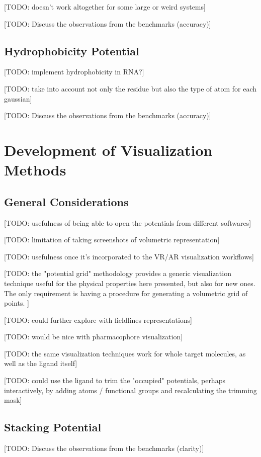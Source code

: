     [TODO: doesn't work altogether for some large or weird systems]

    [TODO: Discuss the observations from the benchmarks (accuracy)]

  \subsection{Hydrophobicity Potential}
    [TODO: implement hydrophobicity in RNA?]

    [TODO: take into account not only the residue but also the type of atom for each gaussian]

    [TODO: Discuss the observations from the benchmarks (accuracy)]


\section{Development of Visualization Methods}
  \subsection{General Considerations}
    [TODO: usefulness of being able to open the potentials from different softwares]

    [TODO: limitation of taking screenshots of volumetric representation]

    [TODO: usefulness once it's incorporated to the VR/AR visualization workflows]

    [TODO: the "potential grid" methodology provides a generic visualization technique useful for the physical properties here presented, but also for new ones. The only requirement is having a procedure for generating a volumetric grid of points. ] %

    [TODO: could further explore with fieldlines representations]

    [TODO: would be nice with pharmacophore visualization]

    [TODO: the same visualization techniques work for whole target molecules, as well as the ligand itself]

    [TODO: could use the ligand to trim the "occupied" potentials, perhaps interactively, by adding atoms / functional groups and recalculating the trimming mask]

  \subsection{Stacking Potential}
    [TODO: Discuss the observations from the benchmarks (clarity)]

